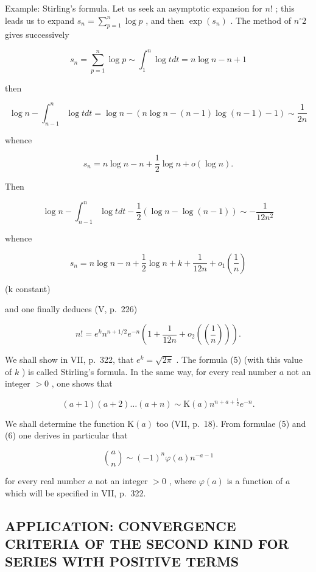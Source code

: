 Example: Stirling's formula. Let us seek an asymptotic expansion for \(n!\) ; this leads us to expand \(s_n = \sum_{p=1}^{n} \log p\) , and then \(\exp(s_n)\) . The method of \(n^{\circ} 2\) gives successively

\[
s _ {n} = \sum_ {p = 1} ^ {n} \log p \sim \int_ {1} ^ {n} \log t d t = n \log n - n + 1
\]

then

\[
\log n - \int_ {n - 1} ^ {n} \log t d t = \log n - (n \log n - (n - 1) \log (n - 1) - 1) \sim \frac {1}{2 n}
\]

whence

\[
s _ {n} = n \log n - n + \frac {1}{2} \log n + o (\log n).
\]

Then

\[
\log n - \int_ {n - 1} ^ {n} \log t d t - \frac {1}{2} (\log n - \log (n - 1)) \sim - \frac {1}{1 2 n ^ {2}}
\]

whence

\[
s _ {n} = n \log n - n + \frac {1}{2} \log n + k + \frac {1}{1 2 n} + o _ {1} \left(\frac {1}{n}\right)
\]

(k constant)

and one finally deduces (V, p.~226)

\[
n! = e ^ {k} n ^ {n + 1 / 2} e ^ {- n} \left(1 + \frac {1}{1 2 n} + o _ {2} \left(\left(\frac {1}{n}\right)\right)\right).\tag{5}
\]

We shall show in VII, p.~322, that \(e^k = \sqrt{2\pi}\) . The formula (5) (with this value of \(k\) ) is called Stirling's formula. In the same way, for every real number \(a\) not an integer \(>0\) , one shows that

\[
(a + 1) (a + 2) \dots (a + n) \sim \mathrm{K} (a) n ^ {n + a + \frac {1}{2}} e ^ {- n}.\tag{6}
\]

We shall determine the function \(\mathrm{K}(a)\) too (VII, p.~18). From formulae (5) and (6) one derives in particular that

\[
\binom {a} {n} \sim (- 1) ^ {n}   \varphi (a)   n ^ {- a - 1}\tag{7}
\]

for every real number \(a\) not an integer \(> 0\) , where \(\varphi(a)\) is a function of \(a\) which will be specified in VII, p.~322.

\subsection{APPLICATION: CONVERGENCE CRITERIA OF THE SECOND KIND FOR SERIES WITH POSITIVE TERMS}

